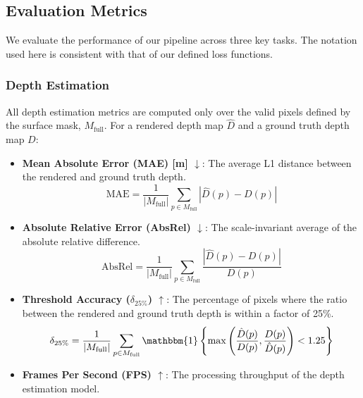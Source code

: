 
\subsection{Evaluation Metrics}
We evaluate the performance of our pipeline across three key tasks. The notation used here is consistent with that of our defined loss functions.

\subsubsection{Depth Estimation}
All depth estimation metrics are computed only over the valid pixels defined by the surface mask, $M_{\text{full}}$. For a rendered depth map $\hat{D}$ and a ground truth depth map $D$:
\begin{itemize}
	\item \textbf{Mean Absolute Error (MAE) [m] $\downarrow$}: The average L1 distance between the rendered and ground truth depth.
	      \begin{equation}
		      \text{MAE} = \frac{1}{|M_{\text{full}}|} \sum_{p \in M_{\text{full}}} |\hat{D}(p) - D(p)|
	      \end{equation}

	\item \textbf{Absolute Relative Error (AbsRel) $\downarrow$}: The scale-invariant average of the absolute relative difference.
	      \begin{equation}
		      \text{AbsRel} = \frac{1}{|M_{\text{full}}|} \sum_{p \in M_{\text{full}}} \frac{|\hat{D}(p) - D(p)|}{D(p)}
	      \end{equation}

	\item \textbf{Threshold Accuracy ($\delta_{25\%}$) $\uparrow$}: The percentage of pixels where the ratio between the rendered and ground truth depth is within a factor of 25\%.
	      \begin{equation}
		      \delta_{25\%} = \frac{1}{|M_{\text{full}}|} \sum_{p \in M_{\text{full}}} \mathbbm{1}\left\{\max\left(\frac{\hat{D}(p)}{D(p)}, \frac{D(p)}{\hat{D}(p)}\right) < 1.25\right\}
	      \end{equation}

	\item \textbf{Frames Per Second (FPS) $\uparrow$}: The processing throughput of the depth estimation model.
\end{itemize}

